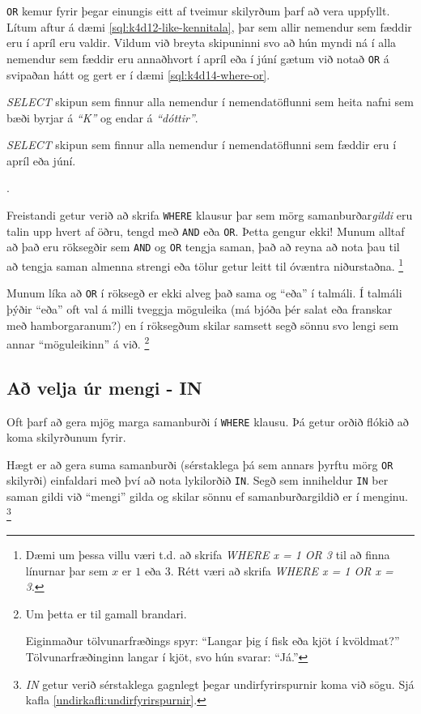 \verb|OR| kemur fyrir þegar einungis eitt af tveimur skilyrðum þarf að vera uppfyllt. Lítum aftur á dæmi \ref{sql:k4d12-like-kennitala}, þar sem allir nemendur sem fæddir eru í apríl eru valdir. Vildum við breyta skipuninni svo að hún myndi ná í alla nemendur sem fæddir eru annaðhvort í apríl eða í júní gætum við notað \verb|OR| á svipaðan hátt og gert er í dæmi \ref{sql:k4d14-where-or}.

\begin{example}
\caption[WHERE með AND]{\emph{SELECT} skipun sem finnur alla nemendur í nemendatöflunni sem heita nafni sem bæði byrjar á \emph{``K''} og endar á \emph{``dóttir''}.}
\label{sql:k4d13-where-and}
\centering
{}
\end{example}

\begin{example}
\caption[WHERE með OR]{\emph{SELECT} skipun sem finnur alla nemendur í nemendatöflunni sem fæddir eru í apríl eða júní.}
\label{sql:k4d14-where-or}.
\centering
{}
\end{example}

Freistandi getur verið að skrifa \verb|WHERE| klausur þar sem mörg samanburðar\emph{gildi} eru talin upp hvert af öðru, tengd með \verb|AND| eða \verb|OR|. Þetta gengur ekki! Munum alltaf að það eru röksegðir sem \verb|AND| og \verb|OR| tengja saman, það að reyna að nota þau til að tengja saman almenna strengi eða tölur getur leitt til óvæntra niðurstaðna. \footnote{Dæmi um þessa villu væri t.d. að skrifa \emph{WHERE x = 1 OR 3} til að finna línurnar þar sem $x$ er $1$ eða $3$. Rétt væri að skrifa \emph{WHERE x = 1 OR x = 3}.}

Munum líka að \verb|OR| í röksegð er ekki alveg það sama og ``eða'' í talmáli. Í talmáli þýðir ``eða'' oft val á milli tveggja möguleika (má bjóða þér salat eða franskar með hamborgaranum?) en í röksegðum skilar samsett segð sönnu svo lengi sem annar ``möguleikinn'' á við. \footnote{Um þetta er til gamall brandari.

Eiginmaður tölvunarfræðings spyr: ``Langar þig í fisk eða kjöt í kvöldmat?'' Tölvunarfræðinginn langar í kjöt, svo hún svarar: ``Já.''}
\subsection{Að velja úr mengi - IN} %
Oft þarf að gera mjög marga samanburði í \verb|WHERE| klausu. Þá getur orðið flókið að koma skilyrðunum fyrir.

Hægt er að gera suma samanburði (sérstaklega þá sem annars þyrftu mörg \verb|OR| skilyrði) einfaldari með því að nota lykilorðið \verb|IN|. Segð sem inniheldur \verb|IN| ber saman gildi við ``mengi'' gilda og skilar sönnu ef samanburðargildið er í menginu. \footnote{\emph{IN} getur verið sérstaklega gagnlegt þegar undirfyrirspurnir koma við sögu. Sjá kafla \ref{undirkafli:undirfyrirspurnir}.}

